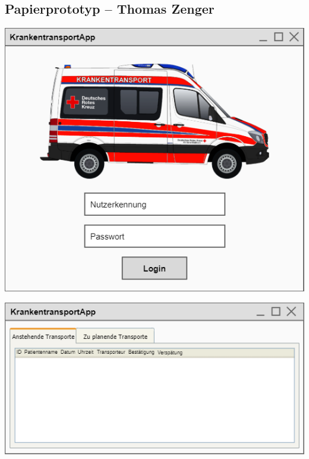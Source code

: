 \documentclass[a4paper, ngerman, 12pt]{scrartcl}
\begin{document}
\subsection{Papierprototyp – Thomas Zenger}
\begin{center}
\begin{minipage}[b]{0.48\textwidth}
	\centering
	\includegraphics[width=\textwidth]{Bilder/loginpage.png}
	\label{img:zenger1}
\end{minipage}
\begin{minipage}[b]{0.48\textwidth}
	\centering
	\includegraphics[width=\textwidth]{Bilder/mainpage.png}
	\label{img:zenger2}
\end{minipage}
\end{center}
\end{document}
